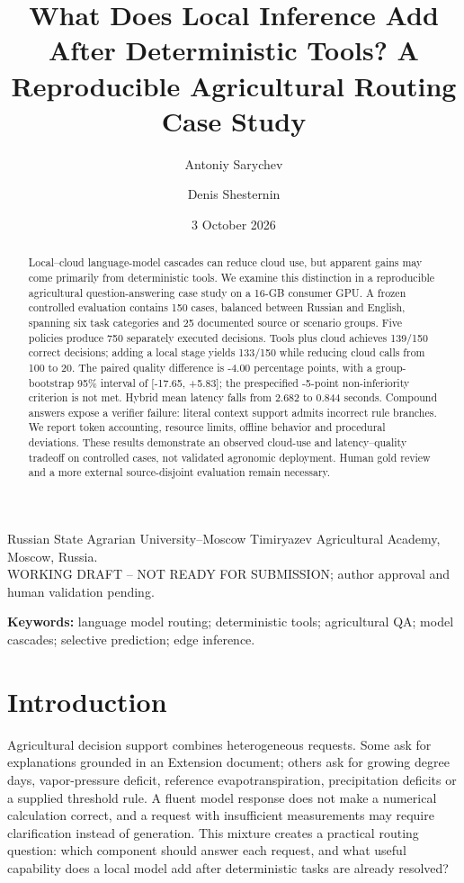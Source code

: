 \documentclass[10pt,a4paper,twocolumn]{article}
\title{What Does Local Inference Add After Deterministic Tools? A Reproducible Agricultural Routing Case Study}
\author{Antoniy Sarychev \and Denis Shesternin}
\date{3 October 2026}
\begin{document}
\maketitle
\begin{center}\small
Russian State Agrarian University--Moscow Timiryazev Agricultural Academy, Moscow, Russia.\\
WORKING DRAFT -- NOT READY FOR SUBMISSION; author approval and human validation pending.
\end{center}
\begin{abstract}
Local--cloud language-model cascades can reduce cloud use, but apparent gains may come primarily from deterministic tools. We examine this distinction in a reproducible agricultural question-answering case study on a 16-GB consumer GPU. A frozen controlled evaluation contains 150 cases, balanced between Russian and English, spanning six task categories and 25 documented source or scenario groups. Five policies produce 750 separately executed decisions. Tools plus cloud achieves 139/150 correct decisions; adding a local stage yields 133/150 while reducing cloud calls from 100 to 20. The paired quality difference is -4.00 percentage points, with a group-bootstrap 95\% interval of [-17.65, +5.83]; the prespecified -5-point non-inferiority criterion is not met. Hybrid mean latency falls from 2.682 to 0.844 seconds. Compound answers expose a verifier failure: literal context support admits incorrect rule branches. We report token accounting, resource limits, offline behavior and procedural deviations. These results demonstrate an observed cloud-use and latency--quality tradeoff on controlled cases, not validated agronomic deployment. Human gold review and a more external source-disjoint evaluation remain necessary.
\end{abstract}
\noindent\textbf{Keywords:} language model routing; deterministic tools; agricultural QA; model cascades; selective prediction; edge inference.

\section{Introduction}

Agricultural decision support combines heterogeneous requests. Some ask for explanations grounded in an Extension document; others ask for growing degree days, vapor-pressure deficit, reference evapotranspiration, precipitation deficits or a supplied threshold rule. A fluent model response does not make a numerical calculation correct, and a request with insufficient measurements may require clarification instead of generation. This mixture creates a practical routing question: which component should answer each request, and what useful capability does a local model add after deterministic tasks are already resolved?
\end{document}
